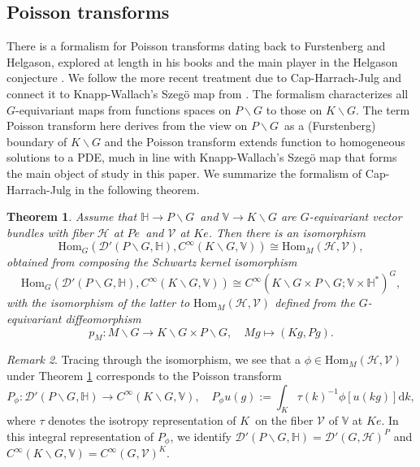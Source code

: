 \documentclass[a4paper,reqno]{amsart}
\numberwithin{equation}{section}
\newtheorem{thm}{Theorem}[section]
\theoremstyle{definition}
\theoremstyle{remark}
\newtheorem{remark}[thm]{Remark}
\begin{document}
\subsection{Poisson transforms}

There is a formalism for Poisson transforms dating back to Furstenberg \cite{furstann} and Helgason, explored at length in his books \cite{HelgasonDGLGSS,helgasongga,helgasongass} and the main player in the Helgason conjecture \cite{helgason70,helgason76}. We follow the more recent treatment due to Cap-Harrach-Julg \cite{capjulg} and connect it to Knapp-Wallach's Szegö map from \cite{knappwallach}. The formalism characterizes all $G$-equivariant maps from functions spaces on $P\backslash G$ to those on $K\backslash G$. The term Poisson transform here derives from the view on $P\backslash G$ as a (Furstenberg) boundary of $K\backslash G$ and the Poisson transform extends function to homogeneous solutions to a PDE, much in line with Knapp-Wallach's Szegö map \cite{knappwallach} that forms the main object of study in this paper. We summarize the formalism of Cap-Harrach-Julg \cite{capjulg} in the following theorem. 

\begin{thm}
\label{chjthm}
Assume that $\mathbb{H}\to P\backslash G$ and $\mathbb{V}\to K\backslash G$ are $G$-equivariant vector bundles with fiber $\mathcal{H}$ at $Pe$ and $\mathcal{V}$ at $Ke$. Then there is an isomorphism 
$$\mathrm{Hom}_G(\mathcal{D}'(P\backslash G,\mathbb{H}),C^\infty(K\backslash G,\mathbb{V}))\cong \mathrm{Hom}_M(\mathcal{H},\mathcal{V}),$$
obtained from composing the Schwartz kernel isomorphism 
$$\mathrm{Hom}_G(\mathcal{D}'(P\backslash G,\mathbb{H}),C^\infty(K\backslash G,\mathbb{V}))\cong C^\infty(K\backslash G\times P\backslash G; \mathbb{V}\times \mathbb{H}^*)^G,$$
with the isomorphism of the latter to $\mathrm{Hom}_M(\mathcal{H},\mathcal{V})$ defined from the $G$-equivariant diffeomorphism 
$$p_M:M\backslash G\to K\backslash G\times P\backslash G, \quad Mg\mapsto (Kg,Pg).$$
\end{thm}

\begin{remark}
Tracing through the isomorphism, we see that a $\phi\in  \mathrm{Hom}_M(\mathcal{H},\mathcal{V})$ under Theorem \ref{chjthm} corresponds to the Poisson transform
$$P_\phi:\mathcal{D}'(P\backslash G,\mathbb{H})\to C^\infty(K\backslash G,\mathbb{V}), \quad P_\phi u(g):=\int_{K} \tau(k)^{-1}\phi [u(kg)]\mathrm{d} k,$$
where $\tau$ denotes the isotropy representation of $K$ on the fiber $\mathcal{V}$ of $\mathbb{V}$ at $Ke$. In this integral representation of $P_\phi$, we identify $\mathcal{D}'(P\backslash G,\mathbb{H})=\mathcal{D}'(G,\mathcal{H})^P$ and $C^\infty(K\backslash G,\mathbb{V})=C^\infty( G,\mathcal{V})^K$.
\end{remark}
\end{document}
